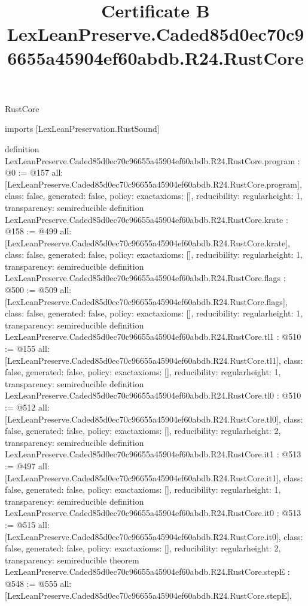 \begin{lexlean}{RustCore}
\title{Certificate B LexLeanPreserve.Caded85d0ec70c96655a45904ef60abdb.R24.RustCore}
\begin{coremodule}
imports [LexLeanPreservation.RustSound]

definition LexLeanPreserve.Caded85d0ec70c96655a45904ef60abdb.R24.RustCore.program : @0 := @157 {
  all: [LexLeanPreserve.Caded85d0ec70c96655a45904ef60abdb.R24.RustCore.program],
  class: false,
  generated: false,
  policy: exact{axioms: []},
  reducibility: regular{height: 1},
  transparency: semireducible
}
definition LexLeanPreserve.Caded85d0ec70c96655a45904ef60abdb.R24.RustCore.krate : @158 := @499 {
  all: [LexLeanPreserve.Caded85d0ec70c96655a45904ef60abdb.R24.RustCore.krate],
  class: false,
  generated: false,
  policy: exact{axioms: []},
  reducibility: regular{height: 1},
  transparency: semireducible
}
definition LexLeanPreserve.Caded85d0ec70c96655a45904ef60abdb.R24.RustCore.flags : @500 := @509 {
  all: [LexLeanPreserve.Caded85d0ec70c96655a45904ef60abdb.R24.RustCore.flags],
  class: false,
  generated: false,
  policy: exact{axioms: []},
  reducibility: regular{height: 1},
  transparency: semireducible
}
definition LexLeanPreserve.Caded85d0ec70c96655a45904ef60abdb.R24.RustCore.tl1 : @510 := @155 {
  all: [LexLeanPreserve.Caded85d0ec70c96655a45904ef60abdb.R24.RustCore.tl1],
  class: false,
  generated: false,
  policy: exact{axioms: []},
  reducibility: regular{height: 1},
  transparency: semireducible
}
definition LexLeanPreserve.Caded85d0ec70c96655a45904ef60abdb.R24.RustCore.tl0 : @510 := @512 {
  all: [LexLeanPreserve.Caded85d0ec70c96655a45904ef60abdb.R24.RustCore.tl0],
  class: false,
  generated: false,
  policy: exact{axioms: []},
  reducibility: regular{height: 2},
  transparency: semireducible
}
definition LexLeanPreserve.Caded85d0ec70c96655a45904ef60abdb.R24.RustCore.it1 : @513 := @497 {
  all: [LexLeanPreserve.Caded85d0ec70c96655a45904ef60abdb.R24.RustCore.it1],
  class: false,
  generated: false,
  policy: exact{axioms: []},
  reducibility: regular{height: 1},
  transparency: semireducible
}
definition LexLeanPreserve.Caded85d0ec70c96655a45904ef60abdb.R24.RustCore.it0 : @513 := @515 {
  all: [LexLeanPreserve.Caded85d0ec70c96655a45904ef60abdb.R24.RustCore.it0],
  class: false,
  generated: false,
  policy: exact{axioms: []},
  reducibility: regular{height: 2},
  transparency: semireducible
}
theorem LexLeanPreserve.Caded85d0ec70c96655a45904ef60abdb.R24.RustCore.stepE : @548 := @555 {
  all: [LexLeanPreserve.Caded85d0ec70c96655a45904ef60abdb.R24.RustCore.stepE],
}
\end{coremodule}
\end{lexlean}
